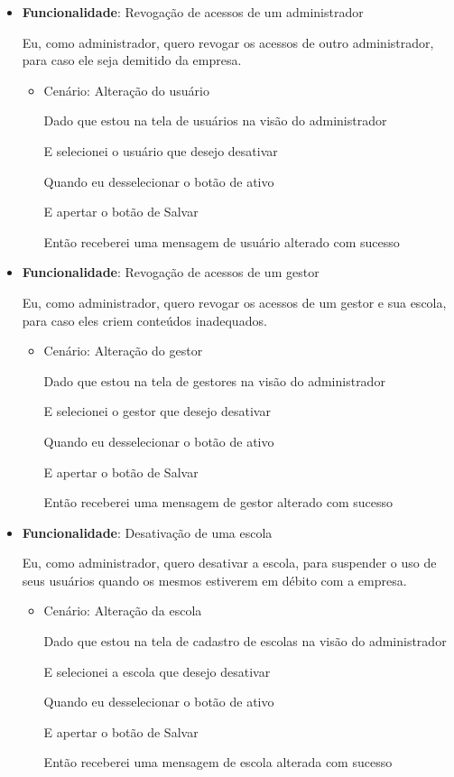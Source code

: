 \documentclass[
    12pt,               %
    openright,          %
    oneside,
    a4paper,            %
    english,            %
    brazil              %
    ]{ifsp-spo-inf-ctds} %
\begin{document}
\begin{itemize}
\item\textbf{Funcionalidade}: Revogação de acessos de um administrador
    
    Eu, como administrador, quero revogar os acessos de outro administrador, para caso ele seja demitido da empresa.
    \begin{itemize}
        \item Cenário: Alteração do usuário
        \par Dado que estou na tela de usuários na visão do administrador
        \par E selecionei o usuário que desejo desativar
        \par Quando eu desselecionar o botão de ativo 
        \par E apertar o botão de Salvar
        \par Então receberei uma mensagem de usuário alterado com sucesso
    \end{itemize}   

\item\textbf{Funcionalidade}: Revogação de acessos de um gestor
    
    Eu, como administrador, quero revogar os acessos de um gestor e sua escola, para caso eles criem conteúdos inadequados.
    \begin{itemize}
        \item Cenário: Alteração do gestor
        \par Dado que estou na tela de gestores na visão do administrador
        \par E selecionei o gestor que desejo desativar
        \par Quando eu desselecionar o botão de ativo 
        \par E apertar o botão de Salvar
        \par Então receberei uma mensagem de gestor alterado com sucesso
    \end{itemize}  

\item\textbf{Funcionalidade}: Desativação de uma escola
    
    Eu, como administrador, quero desativar a escola, para suspender o uso de seus usuários quando os mesmos estiverem em débito com a empresa.
    \begin{itemize}
        \item Cenário: Alteração da escola  
        \par Dado que estou na tela de cadastro de escolas na visão do administrador
        \par E selecionei a escola que desejo desativar
        \par Quando eu desselecionar o botão de ativo 
        \par E apertar o botão de Salvar
        \par Então receberei uma mensagem de escola alterada com sucesso
    \end{itemize}   
    

\end{itemize}
\end{document}
